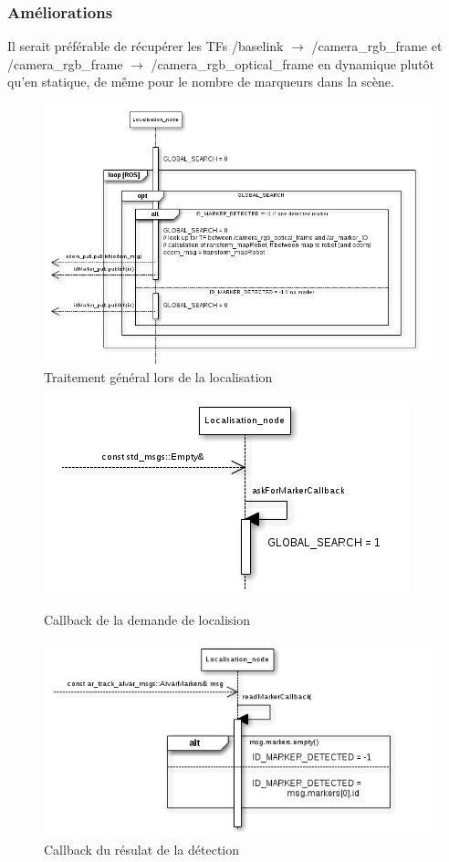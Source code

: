 \documentclass[10pt,a4paper]{article}
\begin{document}
\subsubsection*{Améliorations}
Il serait préférable de récupérer les TFs /baselink $\rightarrow$ /camera\_rgb\_frame et /camera\_rgb\_frame $\rightarrow$ /camera\_rgb\_optical\_frame en dynamique plutôt qu'en statique, de même pour le nombre de marqueurs dans la scène.

\begin{figure}
\center\noindent
\includegraphics[scale=0.6]{figures/locaprocess.png} 
\caption{Traitement général lors de la localisation}	
\end{figure}

\begin{figure}
 \begin{minipage}[b]{.48\linewidth}
\includegraphics[scale=0.5]{figures/locacbask.png} 
  \caption{Callback de la demande de localision}
 \end{minipage} \hfill
 \begin{minipage}[b]{.46\linewidth}
\includegraphics[scale=0.5]{figures/locacb2read.png} 
  \caption{Callback du résulat de la détection}
 \end{minipage}
\end{figure}
\end{document}
